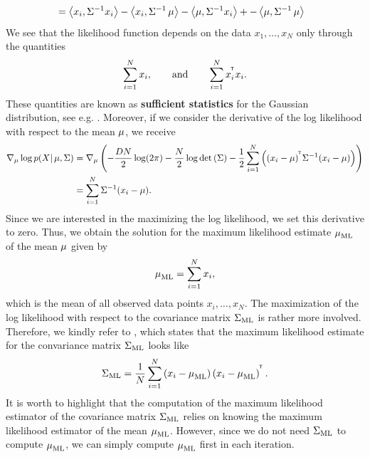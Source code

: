 \begin{example}
\begin{align*}
&= \left\langle x_i, \S^{-1}x_i \right\rangle - \left\langle x_i, \S^{-1} \m \right\rangle - \left\langle \m, \S^{-1}x_i \right\rangle + - \left\langle \m, \S^{-1}\m \right\rangle
\end{align*}
We see that the likelihood function depends on the data $x_1,\ldots, x_N$ only through the quantities
\begin{align*}
\sum_{i=1}^N x_i, \qquad\text{and} \qquad \sum_{i=1}^N x_i^{\tran}x_i.
\end{align*}
These quantities are known as \textbf{sufficient statistics} for the Gaussian distribution, see e.g. \cite[Definition~15.8]{meintrup2006stochastik}. Moreover, if we consider the derivative of the log likelihood with respect to the mean $\m$, we receive
\begin{align*}
\nabla_{\m} \log p(X| \m, \S) &= \nabla_{\m} \left( -\frac{DN}{2}\log(2\pi) - \frac{N}{2} \log \det\left(\S\right) - \frac{1}{2} \sum_{i=1}^N \left( (x_i - \m)^{\tran}\S^{-1} (x_i - \m) \right) \right)\\
&= \sum_{i=1}^N \S^{-1} (x_i-\m).
\end{align*}
Since we are interested in the maximizing the log likelihood, we set this derivative to zero. Thus, we obtain the solution for the maximum likelihood estimate $\m_{\text{ML}}$ of the mean $\m$ given by
\begin{align*}
\m_{\text{ML}} = \sum_{i=1}^N x_i,
\end{align*}
which is the mean of all observed data points $x_i,\ldots, x_N$. The maximization of the log likelihood with respect to the covariance matrix $\S_{\text{ML}}$ is rather more involved. Therefore, we kindly refer to \cite[Chapter~15.3, Theorem~1]{magnus2019matrix}, which states that the maximum likelihood estimate for the convariance matrix $\S_{\text{ML}}$ looks like
\begin{align*}
\S_{\text{ML}} = \frac{1}{N} \sum_{i=1}^N \left( x_i - \m_{\text{ML}} \right)\left( x_i - \m_{\text{ML}} \right)^{\tran}.
\end{align*}
It is worth to highlight that the computation of the maximum likelihood estimator of the covariance matrix $\S_{\text{ML}}$ relies on knowing the maximum likelihood estimator of the mean $\m_{\text{ML}}$. However, since we do not need $\S_{\text{ML}}$ to compute $\m_{\text{ML}}$, we can simply compute $\m_{\text{ML}}$ first in each iteration.
\end{example}

